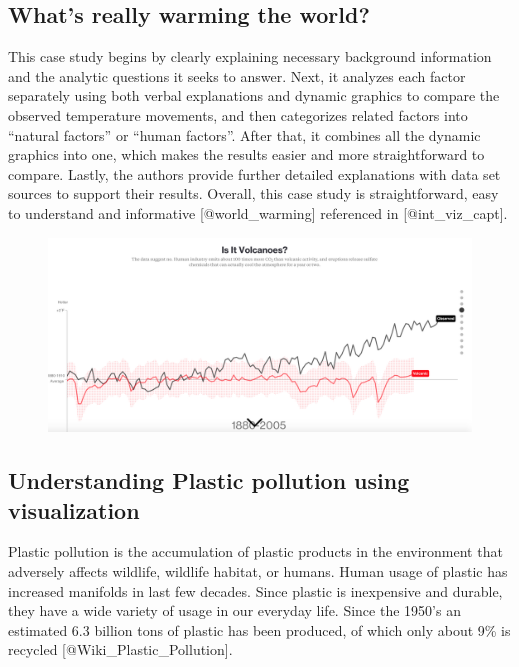 \documentclass[]{book}
\theoremstyle{definition}
\theoremstyle{definition}
\theoremstyle{definition}
\theoremstyle{remark}
\begin{document}
\subsection{What's really warming the
world?}\label{whats-really-warming-the-world}

This case study begins by clearly explaining necessary background
information and the analytic questions it seeks to answer. Next, it
analyzes each factor separately using both verbal explanations and
dynamic graphics to compare the observed temperature movements, and then
categorizes related factors into ``natural factors'' or ``human
factors''. After that, it combines all the dynamic graphics into one,
which makes the results easier and more straightforward to compare.
Lastly, the authors provide further detailed explanations with data set
sources to support their results. Overall, this case study is
straightforward, easy to understand and informative
{[}@world\_warming{]} referenced in {[}@int\_viz\_capt{]}.

\begin{figure}
\centering
\includegraphics{images/volcano_global_warming.png}
\caption{}
\end{figure}

\subsection{Understanding Plastic pollution using
visualization}\label{understanding-plastic-pollution-using-visualization}

Plastic pollution is the accumulation of plastic products in the
environment that adversely affects wildlife, wildlife habitat, or
humans. Human usage of plastic has increased manifolds in last few
decades. Since plastic is inexpensive and durable, they have a wide
variety of usage in our everyday life. Since the 1950's an estimated 6.3
billion tons of plastic has been produced, of which only about 9\% is
recycled {[}@Wiki\_Plastic\_Pollution{]}.
\end{document}
